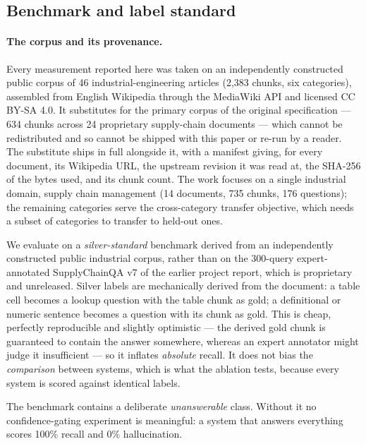 \documentclass[preprint,3p,times]{elsarticle}
\begin{document}
\subsection{Benchmark and label standard}

\paragraph{The corpus and its provenance.} Every measurement reported here was taken on an independently constructed public corpus of 46 industrial-engineering articles (2{,}383 chunks, six categories), assembled from English Wikipedia through the MediaWiki API and licensed CC BY-SA 4.0. It substitutes for the primary corpus of the original specification --- 634 chunks across 24 proprietary supply-chain documents --- which cannot be redistributed and so cannot be shipped with this paper or re-run by a reader. The substitute ships in full alongside it, with a manifest giving, for every document, its Wikipedia URL, the upstream revision it was read at, the SHA-256 of the bytes used, and its chunk count. The work focuses on a single industrial domain, supply chain management (14 documents, 735 chunks, 176 questions); the remaining categories serve the cross-category transfer objective, which needs a subset of categories to transfer to held-out ones.


We evaluate on a \emph{silver-standard} benchmark derived from an independently
constructed public industrial corpus, rather than on the 300-query
expert-annotated SupplyChainQA v7 of the earlier project report, which is
proprietary and unreleased. Silver labels are mechanically derived from the
document: a table cell becomes a lookup question with the table chunk as gold;
a definitional or numeric sentence becomes a question with its chunk as gold.
This is cheap, perfectly reproducible and slightly optimistic --- the derived
gold chunk is guaranteed to contain the answer somewhere, whereas an expert
annotator might judge it insufficient --- so it inflates \emph{absolute}
recall. It does not bias the \emph{comparison} between systems, which is what
the ablation tests, because every system is scored against identical labels.

The benchmark contains a deliberate \emph{unanswerable} class. Without it no
confidence-gating experiment is meaningful: a system that answers everything
scores 100\% recall and 0\% hallucination.
\end{document}
